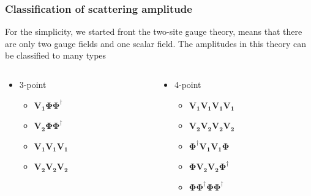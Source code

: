 \documentclass{beamer}
\begin{document}
\begin{frame}
    \frametitle{Classification of scattering amplitude}
    For the simplicity, we started front the two-site gauge theory, means that there are only two gauge fields and one scalar field.
    The amplitudes in this theory can be classified to many types
    \begin{columns}[T]
        \begin{column}{0.48\textwidth}
            \begin{itemize}
                \item 3-point
                    \begin{itemize}
                        \item $\bm{V_1\Phi\Phi^\dagger}$
                        \item $\bm{V_2\Phi\Phi^\dagger}$
                        \item $\bm{V_1V_1V_1}$
                        \item $\bm{V_2V_2V_2}$
                    \end{itemize}
            \end{itemize}
        \end{column}
        \begin{column}{0.48\textwidth}
            \begin{itemize}
                \item 4-point
                \begin{itemize}
                    \item $\bm{V_1V_1V_1V_1}$
                    \item $\bm{V_2V_2V_2V_2}$
                    \item $\bm{\Phi^\dagger V_1V_1\Phi}$
                    \item $\bm{\Phi V_2V_2\Phi^\dagger}$
                    \item $\bm{\Phi\Phi^\dagger\Phi\Phi^\dagger}$
                \end{itemize}
            \end{itemize}
        \end{column}
    \end{columns}
\end{frame}
\end{document}
